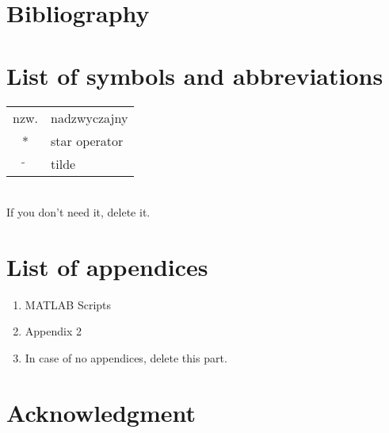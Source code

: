 \chapter{Bibliography}


\printbibliography[type=article,heading=subbibliography,title={Articles}]
\printbibliography[type=online,heading=subbibliography,title={Online}]

\chapter*{List of symbols and abbreviations}


\begin{tabular}{cl}
	nzw. & nadzwyczajny \\
	* & star operator \\
	$\widetilde{}$ & tilde 
\end{tabular}
\\
If you don't need it, delete it.
\thispagestyle{empty}

\chapter*{List of appendices}


\begin{enumerate}
	\item MATLAB Scripts
	\item Appendix 2
	\item In case of no appendices, delete this part.
\end{enumerate}
\thispagestyle{empty}

\chapter*{Acknowledgment}

